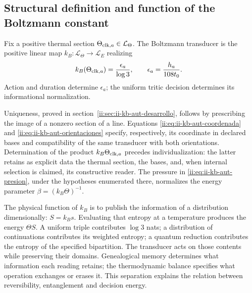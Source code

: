 \subsection{Structural definition and function of the Boltzmann constant}
\label{ii:sec:ii-definicion-boltzmann}

\begin{definition}
Fix a positive thermal section
\(\Theta_{{\rm clk},a}\in\mathcal L_\Theta\). The Boltzmann
transducer is the positive linear map
\(k_B:\mathcal L_\Theta\to\mathcal L_E\) realizing
\begin{equation}
 k_B(\Theta_{{\rm clk},a})
 =\frac{\epsilon_a}{\log3},
 \qquad \epsilon_a=\frac{h_a}{108t_0}.
 \label{ii:eq:ii-definicion-boltzmann-transductor}
\end{equation}
Action and duration determine \(\epsilon_a\); the uniform
tritic decision determines its informational normalization.
\end{definition}

Uniqueness, proved in section~\ref{ii:sec:ii-kb-aut-desarrollo},
follows by prescribing the image of a nonzero section of a line.
Equations \eqref{ii:eq:ii-kb-aut-coordenada} and
\eqref{ii:eq:ii-kb-aut-orientaciones} specify, respectively, its
coordinate in declared bases and compatibility of the same
transducer with both orientations. Determination of the product
\(k_B\Theta_{{\rm clk},a}\) precedes individualization:
the latter retains as explicit data the thermal section, the
bases, and, when internal selection is claimed, its constructive reader.
The pressure in \eqref{ii:eq:ii-kb-aut-presion}, under the hypotheses
enumerated there, normalizes the energy parameter
\(\beta=(k_B\Theta)^{-1}\).

The physical function of \(k_B\) is to publish the information
of a distribution dimensionally: \(S=k_Bs\). Evaluating that
entropy at a temperature produces the energy \(\Theta S\).
A uniform triple contributes \(\log3\) nats; a distribution of
continuations contributes its weighted entropy; a quantum reduction
contributes the entropy of the specified bipartition. The transducer
acts on those contents while preserving their domains. Genealogical
memory determines what information each reading retains; the
thermodynamic balance specifies what operation exchanges or
erases it. This separation explains the relation between reversibility,
entanglement and decision energy.

